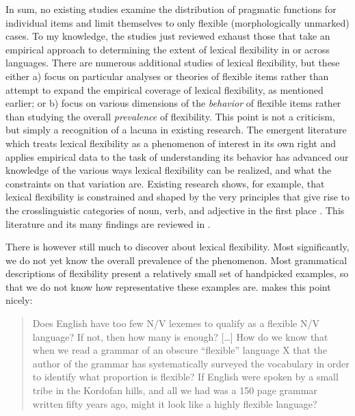 In sum, no existing studies examine the distribution of pragmatic functions for individual items and limit themselves to only flexible (morphologically unmarked) cases. To my knowledge, the studies just reviewed exhaust those that take an empirical approach to determining the extent of lexical flexibility in or across languages. There are numerous additional studies of lexical flexibility, but these either a) focus on particular analyses or theories of flexible items rather than attempt to expand the empirical coverage of lexical flexibility, as mentioned earlier; or b) focus on various dimensions of the \emph{behavior} of flexible items rather than studying the overall \emph{prevalence} of flexibility. This point is not a criticism, but simply a recognition of a lacuna in existing research. The emergent literature which treats lexical flexibility as a phenomenon of interest in its own right and applies empirical data to the task of understanding its behavior has advanced our knowledge of the various ways lexical flexibility can be realized, and what the constraints on that variation are. Existing research shows, for example, that lexical flexibility is constrained and shaped by the very principles that give rise to the crosslinguistic categories of noun, verb, and adjective in the first place \parencites{Croft2000}{Croft2005}{CroftLier2012}. This literature and its many findings are reviewed in .

There is however still much to discover about lexical flexibility. Most significantly, we do not yet know the overall prevalence of the phenomenon. Most grammatical descriptions of flexibility present a relatively small set of handpicked examples, so that we do not know how representative these examples are. \textcite[70]{Croft2001b} makes this point nicely:

\blockquote[{\cite[70]{Croft2001b}}]{Does English have too few N/V lexemes to qualify as a flexible N/V language? If not, then how many is enough? […] How do we know that when we read a grammar of an obscure \enquote{flexible} language X that the author of the grammar has systematically surveyed the vocabulary in order to identify what proportion is flexible? If English were spoken by a small tribe in the Kordofan hills, and all we had was a 150 page grammar written fifty years ago, might it look like a highly flexible language?}

